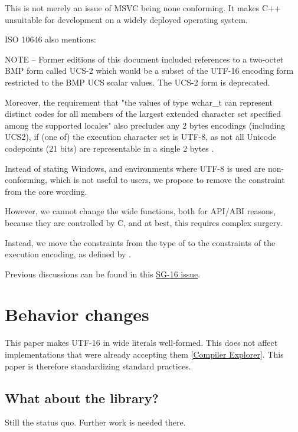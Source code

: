 \documentclass{wg21}
\begin{document}
This is not merely an issue of MSVC being none conforming.
It makes C++ unsuitable for development on a widely deployed operating system.


ISO 10646 also mentions:

\begin{quoteblock}
NOTE – Former editions of this document included references to a two-octet BMP form called UCS-2 which would be a subset of the
UTF-16  encoding form restricted to the BMP UCS scalar values. The UCS-2 form is deprecated.
\end{quoteblock}

Moreover, the requirement that "the values of type wchar_t can represent distinct codes for all
members of the largest extended character set specified among the supported locales" also precludes any 2 bytes encodings (including UCS2),
if (one of) the execution character set is UTF-8, as not all Unicode codepoints (21 bits) are representable in a single 2 bytes .


Instead of stating Windows, and environments where UTF-8 is used are non-conforming, which is not useful to users, we propose to remove the constraint
from the core wording.

However, we cannot change the wide functions, both for API/ABI reasons, because they are controlled by C,
and at best, this requires complex surgery.

Instead, we move the constraints from the type of  to the constraints of the execution encoding,
as defined by .

Previous discussions can be found in this \href{https://github.com/sg16-unicode/sg16/issues/9}{SG-16 issue}.

\section{Behavior changes}

This paper makes UTF-16 in wide literals well-formed. This does not affect implementations that were already accepting them \href{https://godbolt.org/z/cPe69bshM}{[Compiler Explorer]}.
This paper is therefore standardizing standard practices.

\subsection{What about the library?}

Still the status quo. Further work is needed there.
\end{document}
